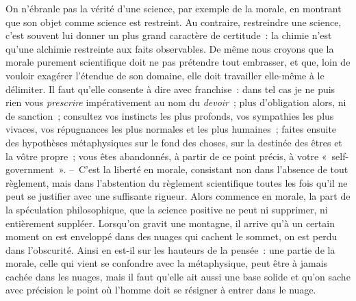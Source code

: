 \documentclass[french,twoside]{book} %
\begin{document}
On n’ébranle pas la vérité d’une science, par exemple de la morale, en montrant que son objet comme science est restreint. Au contraire, restreindre une science, c’est souvent lui donner un plus grand caractère de certitude : la chimie n’est qu’une alchimie restreinte aux faits observables. De même nous croyons que la morale purement scientifique doit ne pas prétendre tout embrasser, et que, loin de vouloir exagérer l’étendue de son domaine, elle doit travailler elle-même à le délimiter. Il faut qu’elle consente à dire avec franchise : dans tel cas je ne puis rien vous \emph{prescrire} impérativement au nom du \emph{devoir} ; plus d’obligation alors, ni de sanction ; consultez vos instincts les plus profonds, vos sympathies les plus vivaces, vos répugnances les plus normales et les plus humaines ; faites ensuite des hypothèses métaphysiques sur le fond des choses, sur la destinée des êtres et la vôtre propre ; vous êtes abandonnés, à partir de ce point précis, à votre « self-government ». – C’est la liberté en morale, consistant non dans l’absence de tout règlement, mais dans l’abstention du règlement scientifique toutes les fois qu’il ne peut se justifier avec une suffisante rigueur. Alors commence en morale, la part de la spéculation philosophique, que la science positive ne peut ni supprimer, ni entièrement suppléer. Lorsqu’on gravit une montagne, il arrive qu’à un certain moment on est enveloppé dans des nuages qui cachent le sommet, on est perdu dans l’obscurité. Ainsi en est-il sur les hauteurs de la pensée : une partie de la morale, celle qui vient se confondre avec la métaphysique, peut être à jamais cachée dans les nuages, mais il faut qu’elle ait aussi une base solide et qu’on sache avec précision le point où l’homme doit se résigner à entrer dans le nuage.\par
\end{document}
